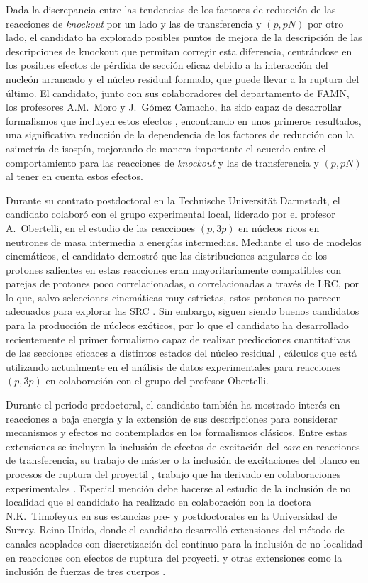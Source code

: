 \documentclass[a4paper,12pt,twoside]{article}
\begin{document}
Dada la discrepancia entre las tendencias de los factores de reducción de las reacciones de \textit{knockout} por un lado y las de transferencia y $(p,pN)$ por otro lado, el candidato ha explorado posibles puntos de mejora de la descripción de las descripciones de knockout que permitan corregir esta diferencia, centrándose en los posibles efectos de pérdida de sección eficaz debido a la interacción del nucleón arrancado y el núcleo residual formado, que puede llevar a la ruptura del último.  El candidato, junto con sus colaboradores del departamento de FAMN, los profesores A.M.~Moro y J.~Gómez Camacho, ha sido capaz de desarrollar formalismos que incluyen estos efectos \cite{complexcdcc,quenching}, encontrando en unos primeros resultados, una significativa reducción de la dependencia de los factores de reducción con la asimetría de isospín, mejorando de manera importante el acuerdo entre el comportamiento para las reacciones de \textit{knockout} y las de transferencia y $(p,pN)$ al tener en cuenta estos efectos.

Durante su contrato postdoctoral en la Technische Universität Darmstadt, el candidato colaboró con el grupo experimental local, liderado por el profesor A.~Obertelli, en el estudio de las reacciones $(p,3p)$ en núcleos ricos en neutrones de masa intermedia a energías intermedias. Mediante el uso de modelos cinemáticos, el candidato demostró que las distribuciones angulares de los protones salientes en estas reacciones eran mayoritariamente compatibles con parejas de protones poco correlacionadas, o correlacionadas a través de LRC, por lo que, salvo selecciones cinemáticas muy estrictas, estos protones no parecen adecuados para explorar las SRC \cite{axel}. Sin embargo, siguen siendo buenos candidatos para la producción de núcleos exóticos, por lo que el candidato ha desarrollado recientemente el primer formalismo capaz de realizar predicciones cuantitativas de las secciones eficaces a distintos estados del núcleo residual \cite{p3p}, cálculos que está utilizando actualmente en el análisis de datos experimentales para reacciones $(p,3p)$ en colaboración con el grupo del profesor Obertelli.

Durante el periodo predoctoral, el candidato también ha mostrado interés en reacciones a baja energía y la extensión de sus descripciones para considerar mecanismos y efectos no contemplados en los formalismos clásicos. Entre estas extensiones se incluyen la inclusión de efectos de excitación del \textit{core} en reacciones de transferencia, su trabajo de máster \cite{transferx} o la inclusión de excitaciones del blanco en procesos de ruptura del proyectil \cite{texc,texctransfer}, trabajo que ha derivado en colaboraciones experimentales \cite{vinicius}. Especial mención debe hacerse al estudio de la inclusión de no localidad que el candidato ha realizado en colaboración con la doctora N.K.~Timofeyuk en sus estancias pre- y postdoctorales en la Universidad de Surrey, Reino Unido, donde el candidato desarrolló extensiones del método de canales acoplados con discretización del continuo para la inclusión de no localidad en reacciones con efectos de ruptura del proyectil \cite{Tim18,Tim19,Fro23} y otras extensiones como la inclusión de fuerzas de tres cuerpos \cite{3nf}. 
\end{document}
